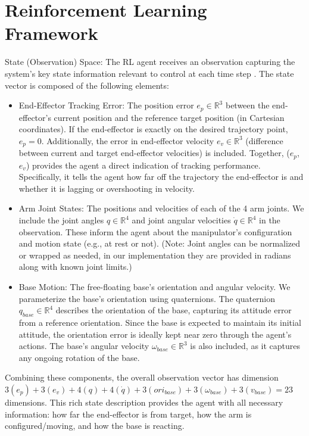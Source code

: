 \documentclass{ieeeaccess}
\begin{document}
\section{Reinforcement Learning Framework}\label{RL}
State (Observation) Space: The RL agent receives an observation capturing the
system’s key state information relevant to control at each time step \cite{b7}. The state vector is composed of the following
elements:
\begin{itemize}
  \item End-Effector Tracking Error: The position error $e_p \in \mathbb{R}^3$ between the end-effector’s current position and the reference target position (in Cartesian coordinates). If the
end-effector is exactly on the desired trajectory point, $e_{p} = 0$. Additionally, the error
in end-effector velocity $e_v \in \mathbb{R}^3$ (difference between current and target end-effector velocities) is included. Together, ($e_{p}$, $e_{v}$) provides the agent a
direct indication of tracking performance. Specifically, it tells the agent how far off the trajectory the end-effector is and whether it is lagging or overshooting in velocity.
  \item Arm Joint States: The positions and velocities of each of the 4 arm joints. We include the joint
angles $q \in \mathbb{R}^4$ and joint angular velocities $\dot q \in \mathbb{R}^4$ in the observation.
These inform the agent about the manipulator’s configuration and motion state (e.g., at rest or not). (Note: Joint angles can
be normalized or wrapped as needed, in our implementation they are provided in radians along
with known joint limits.)
  \item Base Motion: The free-floating base’s orientation and angular velocity. We parameterize the
base’s orientation using quaternions. The quaternion \( q_{base} \in \mathbb{R}^4 \) describes the orientation of the base, capturing its attitude 
error from a reference orientation. Since the base is expected to maintain its initial attitude, the 
orientation error is ideally kept near zero through the agent’s actions. The base’s angular velocity $\omega_{base} \in \mathbb{R}^3$ is also included, as it
captures any ongoing rotation of the base. %
\end{itemize}
\noindent
Combining these components, the overall observation vector has dimension $3 (e_{p}) + 3
(e_{v}) + 4 (q) + 4 (\dot q) + 3 (ori_{base}) + 3 (\omega_{base}) + 3 (v_{base}) = 23$ dimensions. This rich state description provides the agent with all
necessary information: how far the end-effector is from target, how the arm is configured/moving, and
how the base is reacting.
\end{document}
